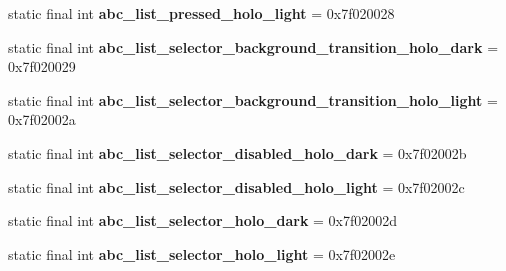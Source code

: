 \begin{DoxyCompactItemize}
\item 
\hypertarget{classandroid_1_1support_1_1v7_1_1appcompat_1_1_r_1_1drawable_a6dc781b7ecc90a01c62f7caa93eaca25}{}static final int {\bfseries abc\+\_\+list\+\_\+pressed\+\_\+holo\+\_\+light} = 0x7f020028\label{classandroid_1_1support_1_1v7_1_1appcompat_1_1_r_1_1drawable_a6dc781b7ecc90a01c62f7caa93eaca25}

\item 
\hypertarget{classandroid_1_1support_1_1v7_1_1appcompat_1_1_r_1_1drawable_a5206c8f4e83eecee100478248fd78ce2}{}static final int {\bfseries abc\+\_\+list\+\_\+selector\+\_\+background\+\_\+transition\+\_\+holo\+\_\+dark} = 0x7f020029\label{classandroid_1_1support_1_1v7_1_1appcompat_1_1_r_1_1drawable_a5206c8f4e83eecee100478248fd78ce2}

\item 
\hypertarget{classandroid_1_1support_1_1v7_1_1appcompat_1_1_r_1_1drawable_aa7337142d0dc014ff2de0d43341501f7}{}static final int {\bfseries abc\+\_\+list\+\_\+selector\+\_\+background\+\_\+transition\+\_\+holo\+\_\+light} = 0x7f02002a\label{classandroid_1_1support_1_1v7_1_1appcompat_1_1_r_1_1drawable_aa7337142d0dc014ff2de0d43341501f7}

\item 
\hypertarget{classandroid_1_1support_1_1v7_1_1appcompat_1_1_r_1_1drawable_a71fb7eb02af378424330d479bc70445e}{}static final int {\bfseries abc\+\_\+list\+\_\+selector\+\_\+disabled\+\_\+holo\+\_\+dark} = 0x7f02002b\label{classandroid_1_1support_1_1v7_1_1appcompat_1_1_r_1_1drawable_a71fb7eb02af378424330d479bc70445e}

\item 
\hypertarget{classandroid_1_1support_1_1v7_1_1appcompat_1_1_r_1_1drawable_ae88e6bec55a3fb3e15ef45c45a9b0a17}{}static final int {\bfseries abc\+\_\+list\+\_\+selector\+\_\+disabled\+\_\+holo\+\_\+light} = 0x7f02002c\label{classandroid_1_1support_1_1v7_1_1appcompat_1_1_r_1_1drawable_ae88e6bec55a3fb3e15ef45c45a9b0a17}

\item 
\hypertarget{classandroid_1_1support_1_1v7_1_1appcompat_1_1_r_1_1drawable_a8f42ab7ba96587cae658fe87d0476849}{}static final int {\bfseries abc\+\_\+list\+\_\+selector\+\_\+holo\+\_\+dark} = 0x7f02002d\label{classandroid_1_1support_1_1v7_1_1appcompat_1_1_r_1_1drawable_a8f42ab7ba96587cae658fe87d0476849}

\item 
\hypertarget{classandroid_1_1support_1_1v7_1_1appcompat_1_1_r_1_1drawable_afeaf9bb6857e838b95037f63d654e90b}{}static final int {\bfseries abc\+\_\+list\+\_\+selector\+\_\+holo\+\_\+light} = 0x7f02002e\label{classandroid_1_1support_1_1v7_1_1appcompat_1_1_r_1_1drawable_afeaf9bb6857e838b95037f63d654e90b}


\end{DoxyCompactItemize}
